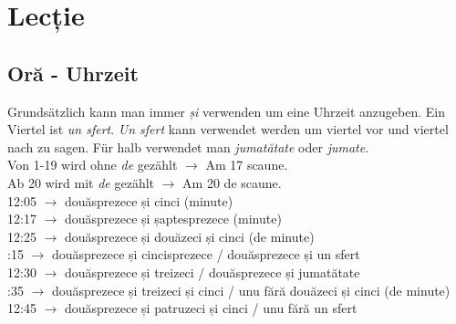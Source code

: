 \documentclass[11pt, oneside]{article}
\begin{document}
\section{Lecție}
%
\subsection{Oră - Uhrzeit}
Grundsätzlich kann man immer \emph{și} verwenden um eine Uhrzeit anzugeben.
Ein Viertel ist \emph{un sfert}. \emph{Un sfert} kann verwendet werden um viertel vor 
und viertel nach zu sagen. Für halb verwendet man \emph{jumatătate} oder \emph{jumate}.\\
\newline
Von 1-19 wird ohne \emph{de} gezählt $\rightarrow$ Am 17 scaune.\\
Ab 20 wird mit \emph{de} gezählt $\rightarrow$ Am 20 de scaune.\\
\newline
%
12:05 $\rightarrow$ douăsprezece și cinci (minute)\\
12:17 $\rightarrow$ douăsprezece și șaptesprezece (minute)\\
12:25 $\rightarrow$ douăsprezece și douăzeci și cinci (de minute)\\
:15 $\rightarrow$ douăsprezece și cincisprezece / douăsprezece și un sfert\\
12:30 $\rightarrow$ douăsprezece și treizeci / douăsprezece și jumatătate\\
:35 $\rightarrow$ douăsprezece și treizeci și cinci / unu fără douăzeci și cinci (de minute)\\
12:45 $\rightarrow$ douăsprezece și patruzeci și cinci / unu fără un sfert\\
%
%
\end{document}
